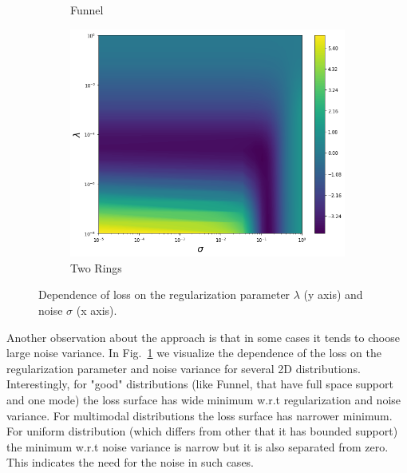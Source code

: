 \begin{figure}[!ht]
\begin{subfigure}[b]{0.32\textwidth}
    \caption{Funnel}
  \end{subfigure}
  \begin{subfigure}[b]{0.32\textwidth}
    \includegraphics[width=\textwidth]{figures/score_matching/loss/lossRings.png}
    \caption{Two Rings}
  \end{subfigure}
  \caption{Dependence of loss on the regularization parameter $\lambda$ (y axis) and noise $\sigma$ (x axis).}
  \label{fig:lossdemo}
\end{figure}
Another observation about the approach is that in some cases it tends to choose
large noise variance.
In Fig.~\ref{fig:lossdemo} we visualize the dependence of the loss on
the regularization parameter and noise variance for several 2D distributions.
Interestingly, for "good" distributions
(like Funnel, that have full space support and one mode) the loss surface has wide
minimum w.r.t regularization and noise variance.
For multimodal distributions the loss surface has narrower minimum.
For uniform distribution (which differs from other that it has bounded support)
the minimum w.r.t noise variance is narrow but it is also separated from zero.
This indicates the need for the noise in such cases.



